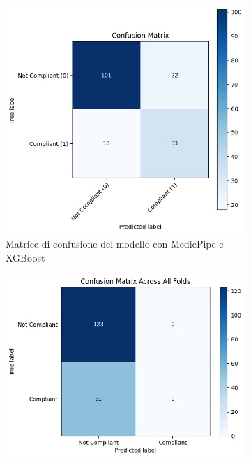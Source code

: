 \documentclass[12pt,a4paper,openright,twoside]{book}
\begin{document}
\begin{figure}[htbp]
    \centering
    \begin{subfigure}{0.45\textwidth}
        \centering
        \includegraphics[width=\linewidth]{figures/mediapipe_xgboost_confusion_matrix.png}
        \caption{Matrice di confusione del modello con MediePipe e XGBoost}
        \label{fig:mediapipe_xgboost_confusion_matrix}
    \end{subfigure}
    \hfill
    \begin{subfigure}{0.45\textwidth}
        \centering
        \includegraphics[width=\linewidth]{figures/mediapipe_keras_confusion_matrix.png}

\end{subfigure}
\end{figure}
\end{document}
